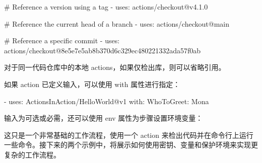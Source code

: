 \begin{shell}
# Reference a version using a tag
- uses: actions/checkout@v4.1.0

# Reference the current head of a branch
- uses: actions/checkout@main

# Reference a specific commit
- uses: actions/checkout@8e5e7e5ab8b370d6c329ec480221332ada57f0ab
\end{shell}

对于同一代码仓库中的本地 actions，如果仅检出库，则可以省略引用。

如果 action 已定义输入，可以使用 with 属性进行指定：

\begin{shell}
- uses: ActionsInAction/HelloWorld@v1
  with:
    WhoToGreet: Mona
\end{shell}

输入为可选或必需，还可以使用 env 属性为步骤设置环境变量：



这只是一个非常基础的工作流程，使用一个 action 来检出代码并在命令行上运行一些命令。接下来的两个示例中，将展示如何使用密钥、变量和保护环境来实现更复杂的工作流程。